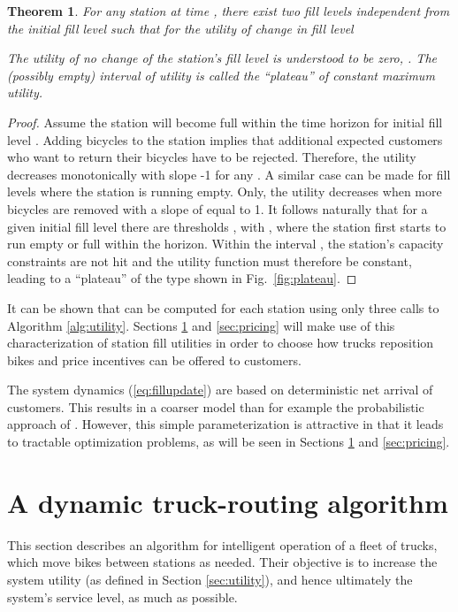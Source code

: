 \documentclass{article}
\newtheorem{theorem}{Theorem}
\begin{document}
\begin{theorem}
  \label{eq:theorem1}
  For any station  at time , there exist two fill levels  independent from the initial fill level
   such that for the utility of change in fill level 
  
  The utility of no change of the station's fill level is understood to be zero,
  . The (possibly empty) interval  of utility is called the ``plateau'' of constant maximum
  utility.
\end{theorem}
\begin{proof}
  Assume the station will become full within the time horizon  for
  initial fill level . Adding  bicycles to the station
  implies that  additional expected customers who want to return their
  bicycles have to be rejected. Therefore, the utility 
  decreases monotonically with slope -1 for any .
   A similar case
  can be made for fill levels where the station is running empty. Only, the
  utility decreases when more bicycles are removed with a slope of  equal to
  1. It follows naturally that for a given initial fill level there are
  thresholds , with , where the station first starts to run empty or full within
  the horizon. Within the interval , the
  station's capacity constraints are not hit and the utility function must
  therefore be constant, leading to a ``plateau'' of the type shown in
  Fig.~\ref{fig:plateau}.
\end{proof}




It can be shown that  can be computed for each station using
only three calls to Algorithm \ref{alg:utility}. Sections \ref{sec:trucks} and
\ref{sec:pricing} will make use of this characterization of station fill
utilities in order to choose how trucks reposition bikes and price incentives
can be offered to customers.

The system dynamics (\ref{eq:fillupdate}) are based on deterministic net arrival
of customers. This results in a coarser model than for example the probabilistic
approach of \cite{raviv_optimal_2013}. However, this simple parameterization is
attractive in that it leads to tractable optimization problems, as will be seen
in Sections \ref{sec:trucks} and \ref{sec:pricing}.

\section{A dynamic truck-routing algorithm}
\label{sec:trucks}

This section describes an algorithm for intelligent operation of a fleet of
 trucks, which move bikes between stations as needed. Their objective
is to increase the system utility (as defined in Section \ref{sec:utility}), and
hence ultimately the system's service level, as much as possible.
\end{document}
